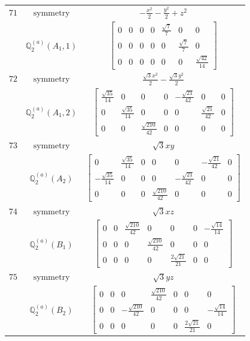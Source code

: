 \documentclass[fleqn,8pt,landscape]{jsarticle}
\begin{document}
\begin{longtable}{ccc}
$ 71 $ & $ \text{symmetry} $ & $ - \frac{x^{2}}{2} - \frac{y^{2}}{2} + z^{2} $ \\
$  $ & $ \mathbb{Q}_{2}^{(a)}(A_{1},1) $ & $ \begin{bmatrix} 0 & 0 & 0 & 0 & \frac{\sqrt{7}}{7} & 0 & 0 \\ 0 & 0 & 0 & 0 & 0 & \frac{\sqrt{7}}{7} & 0 \\ 0 & 0 & 0 & 0 & 0 & 0 & \frac{\sqrt{42}}{14} \end{bmatrix} $ \\ \hline
$ 72 $ & $ \text{symmetry} $ & $ \frac{\sqrt{3} x^{2}}{2} - \frac{\sqrt{3} y^{2}}{2} $ \\
$  $ & $ \mathbb{Q}_{2}^{(a)}(A_{1},2) $ & $ \begin{bmatrix} \frac{\sqrt{35}}{14} & 0 & 0 & 0 & - \frac{\sqrt{21}}{42} & 0 & 0 \\ 0 & \frac{\sqrt{35}}{14} & 0 & 0 & 0 & \frac{\sqrt{21}}{42} & 0 \\ 0 & 0 & \frac{\sqrt{210}}{42} & 0 & 0 & 0 & 0 \end{bmatrix} $ \\ \hline
$ 73 $ & $ \text{symmetry} $ & $ \sqrt{3} x y $ \\
$  $ & $ \mathbb{Q}_{2}^{(a)}(A_{2}) $ & $ \begin{bmatrix} 0 & \frac{\sqrt{35}}{14} & 0 & 0 & 0 & - \frac{\sqrt{21}}{42} & 0 \\ - \frac{\sqrt{35}}{14} & 0 & 0 & 0 & - \frac{\sqrt{21}}{42} & 0 & 0 \\ 0 & 0 & 0 & \frac{\sqrt{210}}{42} & 0 & 0 & 0 \end{bmatrix} $ \\ \hline
$ 74 $ & $ \text{symmetry} $ & $ \sqrt{3} x z $ \\
$  $ & $ \mathbb{Q}_{2}^{(a)}(B_{1}) $ & $ \begin{bmatrix} 0 & 0 & \frac{\sqrt{210}}{42} & 0 & 0 & 0 & - \frac{\sqrt{14}}{14} \\ 0 & 0 & 0 & \frac{\sqrt{210}}{42} & 0 & 0 & 0 \\ 0 & 0 & 0 & 0 & \frac{2 \sqrt{21}}{21} & 0 & 0 \end{bmatrix} $ \\ \hline
$ 75 $ & $ \text{symmetry} $ & $ \sqrt{3} y z $ \\
$  $ & $ \mathbb{Q}_{2}^{(a)}(B_{2}) $ & $ \begin{bmatrix} 0 & 0 & 0 & \frac{\sqrt{210}}{42} & 0 & 0 & 0 \\ 0 & 0 & - \frac{\sqrt{210}}{42} & 0 & 0 & 0 & - \frac{\sqrt{14}}{14} \\ 0 & 0 & 0 & 0 & 0 & \frac{2 \sqrt{21}}{21} & 0 \end{bmatrix} $ \\ \hline

\end{longtable}
\end{document}
